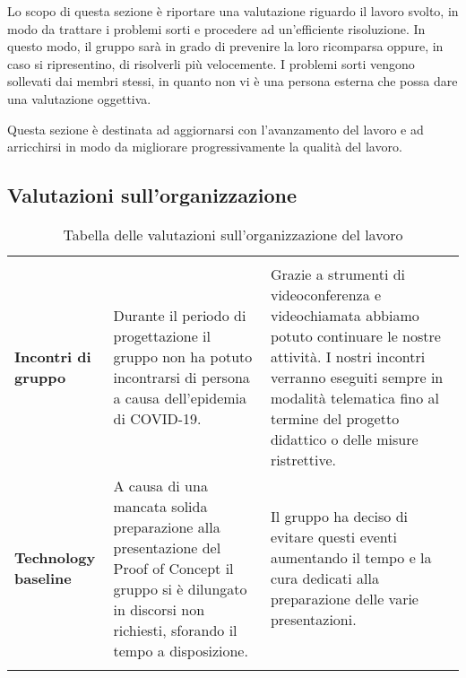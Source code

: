 \documentclass[../piano-di-qualifica.tex]{subfiles}
\begin{document}
Lo scopo di questa sezione è riportare una valutazione riguardo il lavoro svolto, in modo da trattare
i problemi sorti e procedere ad un'efficiente risoluzione.
In questo modo, il gruppo sarà in grado di prevenire la loro ricomparsa oppure, in caso si ripresentino, di risolverli più velocemente.
I problemi sorti vengono sollevati dai membri stessi, in quanto non vi è una
persona esterna che possa dare una valutazione oggettiva.

Questa sezione è destinata ad aggiornarsi con l'avanzamento del lavoro e ad arricchirsi in modo
da migliorare progressivamente la qualità del lavoro.

\subsection{Valutazioni sull'organizzazione}

\begin{longtable}[H]{>{\centering\bfseries}m{4cm} >{\centering\arraybackslash}m{6cm} >{\centering\arraybackslash}m{6cm}}
  \rowcolor{darkgray!90!}
  \color{white}{\textbf{Dominio}} & \color{white}{\textbf{Problema}}                                                                                                                                         & \color{white}{\textbf{Soluzione}}                                                                                                                                                                                                        \\
  Incontri di gruppo              & Durante il periodo di progettazione il gruppo non ha potuto incontrarsi di persona a causa dell'epidemia di COVID-19.                                                    & Grazie a strumenti di videoconferenza e videochiamata abbiamo potuto continuare le nostre attività. I nostri incontri verranno eseguiti sempre in modalità telematica fino al termine del progetto didattico o delle misure ristrettive. \\
  Technology baseline             & A causa di una mancata solida preparazione alla presentazione del Proof of Concept il gruppo si è dilungato in discorsi non richiesti, sforando il tempo a disposizione. & Il gruppo ha deciso di evitare questi eventi aumentando il tempo e la cura dedicati alla preparazione delle varie presentazioni.                                                                                                         \\

  \rowcolor{white}
  \caption{Tabella delle valutazioni sull'organizzazione del lavoro}%
  \label{tab:valutazioni_organizzazione}
\end{longtable}
\end{document}
